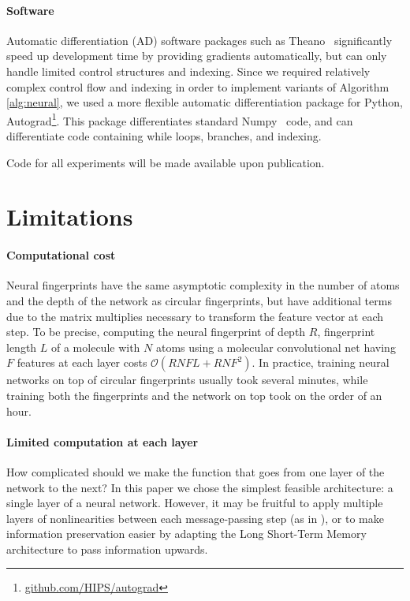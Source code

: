\documentclass{article}
\begin{document}
\paragraph{Software}
Automatic differentiation (AD) software packages such as
Theano~\citep{Bastien-Theano-2012} significantly speed up development time by providing gradients automatically, but can only handle limited control structures and indexing.
Since we required relatively complex control flow and indexing in order to implement variants of Algorithm \ref{alg:neural}, we used a more flexible automatic differentiation package for Python, {\sc Autograd}\footnote{\url{github.com/HIPS/autograd}}.
This package differentiates standard Numpy~\citep{oliphant2007python} code, and can differentiate code containing while loops, branches, and indexing.

Code for all experiments will be made available upon publication.

\section{Limitations}

\paragraph{Computational cost}
Neural fingerprints have the same asymptotic complexity in the number of atoms and the depth of the network as circular fingerprints, but have additional terms due to the matrix multiplies necessary to transform the feature vector at each step.
To be precise, computing the neural fingerprint of depth $R$, fingerprint length $L$ of a molecule with $N$ atoms using a molecular convolutional net having $F$ features at each layer costs $\mathcal{O}(RNFL + RNF^2)$.
In practice, training neural networks on top of circular fingerprints usually took several minutes, while training both the fingerprints and the network on top took on the order of an hour.

\paragraph{Limited computation at each layer}
How complicated should we make the function that goes from one layer of the network to the next?
In this paper we chose the simplest feasible architecture: a single layer of a neural network.
However, it may be fruitful to apply multiple layers of nonlinearities between each message-passing step (as in \cite{graphnn2009}), or to make information preservation easier by adapting the Long Short-Term Memory~\citep{hochreiter1997long} architecture to pass information upwards.
\end{document}
